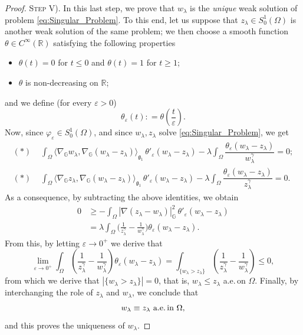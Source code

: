 \documentclass[11pt]{amsart}
\numberwithin{equation}{section} %
\theoremstyle{definition}
\begin{document}
\begin{proof}
	\textsc{Step V)}. In this last step, we prove that $w_\lambda$ is
	the \emph{unique} weak solution of problem \eqref{eq:Singular_Problem}. To this end, let us suppose that $z_\lambda\in S_0^1(\Omega)$ is another
	weak solution of the same problem; we then choose a smooth function $\theta\in C^\infty(\mathbb{R})$ satisfying the following properties
		\begin{itemize}
		 \item  $\theta(t) = 0$ for $t \leq 0$ and $\theta(t) =1$ for $t \geq 1$;
		 \item $\theta$ is non-decreasing on $\mathbb{R}$;
		 \end{itemize}
		and we define (for every $\varepsilon > 0$)
$$\theta_\varepsilon(t): = \theta\left(\frac{t}{\varepsilon}\right).$$ 
Now, since $\varphi_\varepsilon\in S_0^1(\Omega)$, and since
$w_\lambda,z_\lambda$ solve \eqref{eq:Singular_Problem}, we get	
\begin{align*}
	(\ast)\,\,&\int_{\Omega}\langle\nabla_{\mathbb{G}} w_{\lambda}, \nabla_{\mathbb{G}}(w_{\lambda}-z_\lambda)\rangle_{\mathfrak{g}_{1}} \, \theta'_{\varepsilon}(w_{\lambda}-z_\lambda)
			- \lambda \int_{\Omega}\dfrac{\theta_{\varepsilon}(w_{\lambda}-z_\lambda)}{w_{\lambda}^{\gamma}} = 0; \\[0.1cm]
	(\ast)\,\,& \int_{\Omega}\langle\nabla_{\mathbb{G}} z_\lambda, \nabla_{\mathbb{G}}(w_{\lambda}-z_\lambda)\rangle_{\mathfrak{g}_{1}}\, \theta'_{\varepsilon}(w_{\lambda}-z_\lambda) 
	- \lambda \int_{\Omega}\dfrac{\theta_{\varepsilon}(w_{\lambda}-z_\lambda)}{z_\lambda^{\gamma}} = 0.	
		\end{align*}
	As a consequence, by subtracting the above identities, we obtain
	\begin{equation}\label{eq:SubtractionUniqueness}
		\begin{aligned}
			0 &\geq  -\int_{\Omega}|\nabla(z_{\lambda}-w_\lambda)|_{\mathbb{G}}^2 \, \theta'_{\varepsilon}(w_{\lambda}-z_\lambda)
			 \\
			 & =  \lambda\int_\Omega\Big(\frac{1}{z_\lambda^\gamma}-\frac{1}{w_\lambda^\gamma}\Big)\theta_\varepsilon(w_\lambda-z_\lambda).
		\end{aligned}
	\end{equation}
	From this, by letting $\varepsilon \to 0^+$ we derive that	
	$$\lim_{\varepsilon\to 0^+}\int_{\Omega}\left( \dfrac{1}{z_\lambda^{\gamma}} - \dfrac{1}{w_{\lambda}^{\gamma}}\right) \theta_{\varepsilon}(w_{\lambda}-z_\lambda)
	= \int_{\{w_{\lambda}> z_\lambda\}}\left( \dfrac{1}{z_\lambda^{\gamma}}- \dfrac{1}{w_{\lambda}^{\gamma}}\right)\leq 0,$$
	 from which we derive that
	$|\{ w_{\lambda}> z_\lambda\}| = 0$, that is,
	$w_\lambda\leq z_\lambda$ a.e.\,on $\Omega$.	
	Finally, by interchan\-ging the role of $z_\lambda$ and $w_\lambda$,
	we conclude that
	$$\text{$w_\lambda\equiv z_\lambda$ a.e.\,in $\Omega$},$$
	and this proves the uniqueness of $w_\lambda$.
			\end{proof}
\end{document}
